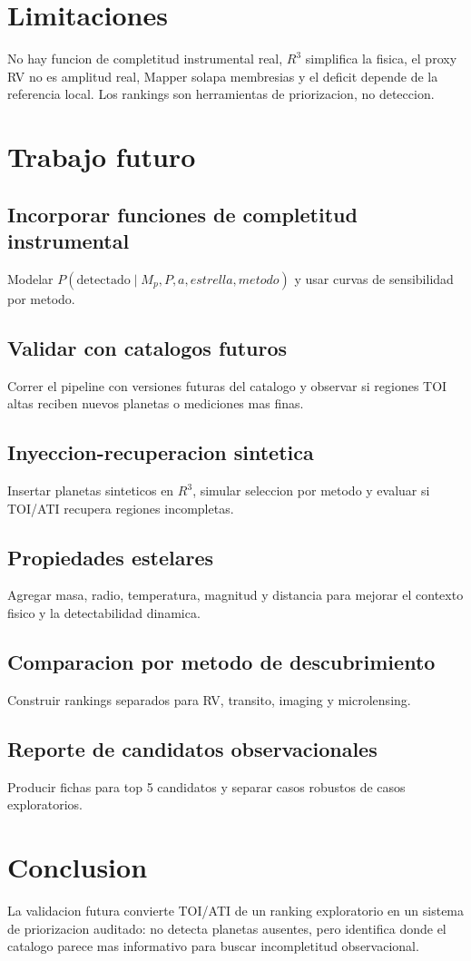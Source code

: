 \documentclass[11pt]{article}
\begin{document}
\section{Limitaciones}
No hay funcion de completitud instrumental real, $R^3$ simplifica la fisica, el proxy RV no es amplitud real, Mapper solapa membresias y el deficit depende de la referencia local. Los rankings son herramientas de priorizacion, no deteccion.

\section{Trabajo futuro}
\subsection{Incorporar funciones de completitud instrumental}
Modelar $P(\mathrm{detectado}\mid M_p, P, a, estrella, metodo)$ y usar curvas de sensibilidad por metodo.

\subsection{Validar con catalogos futuros}
Correr el pipeline con versiones futuras del catalogo y observar si regiones TOI altas reciben nuevos planetas o mediciones mas finas.

\subsection{Inyeccion-recuperacion sintetica}
Insertar planetas sinteticos en $R^3$, simular seleccion por metodo y evaluar si TOI/ATI recupera regiones incompletas.

\subsection{Propiedades estelares}
Agregar masa, radio, temperatura, magnitud y distancia para mejorar el contexto fisico y la detectabilidad dinamica.

\subsection{Comparacion por metodo de descubrimiento}
Construir rankings separados para RV, transito, imaging y microlensing.

\subsection{Reporte de candidatos observacionales}
Producir fichas para top 5 candidatos y separar casos robustos de casos exploratorios.

\section{Conclusion}
La validacion futura convierte TOI/ATI de un ranking exploratorio en un sistema de priorizacion auditado: no detecta planetas ausentes, pero identifica donde el catalogo parece mas informativo para buscar incompletitud observacional.
\end{document}
